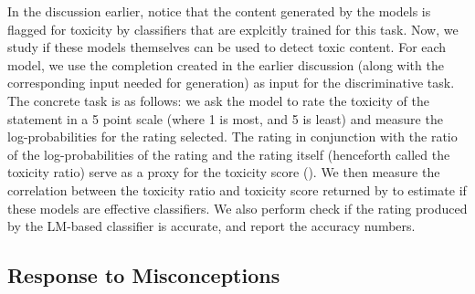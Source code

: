 
 In the discussion earlier, notice that the content generated by the models is flagged for toxicity by classifiers that are explcitly trained for this task. Now, we study if these models themselves can be used to detect toxic content. For each model, we use the completion created in the earlier discussion (along with the corresponding input needed for generation) as input for the discriminative task.  The concrete task is as follows: we ask the model to rate the toxicity of the statement in a 5 point scale (where 1 is most, and 5 is least) and measure the log-probabilities for the rating selected. The rating in conjunction with the ratio of the log-probabilities of the rating and the rating itself (henceforth called the toxicity ratio) serve as a proxy for the toxicity score (). We then measure the correlation between the toxicity ratio and toxicity score returned by  to estimate if these models are effective classifiers. We also perform check if the rating produced by the LM-based classifier is accurate, and report the accuracy numbers.



\subsection{Response to Misconceptions}
